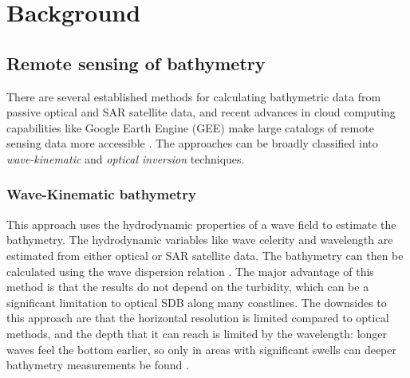 \chapter{Background}


\section{Remote sensing of bathymetry}
There are several established methods for calculating bathymetric data from passive optical and SAR satellite data, and recent advances in cloud computing capabilities like Google Earth Engine (GEE) \parencite{Gorelick2017a} make large catalogs of remote sensing data more accessible \parencite{Pike2019,Turner2021}. The approaches can be broadly classified into \emph{wave-kinematic} and \emph{optical inversion} techniques.

\subsection{Wave-Kinematic bathymetry}
This approach uses the hydrodynamic properties of a wave field to estimate the bathymetry. The hydrodynamic variables like wave celerity and wavelength are estimated from either optical or SAR satellite data. The bathymetry can then be calculated using the wave dispersion relation \cite{Almar2021e}. The major advantage of this method is that the results do not depend on the turbidity, which can be a significant limitation to optical SDB along many coastlines. The downsides to this approach are that the horizontal resolution is limited compared to optical methods, and the depth that it can reach is limited by the wavelength: longer waves feel the bottom earlier, so only in areas with significant swells can deeper bathymetry measurements be found \parencite{Almar2021e}.

